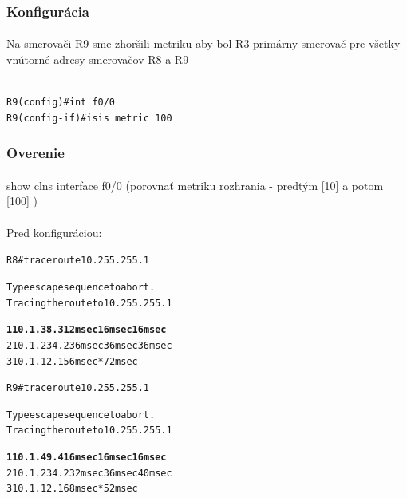 \documentclass[12pt,twoside,a4paper]{report}
\begin{document}
\subsubsection{Konfigurácia}
\paragraph{}
Na smerovači R9 sme zhoršili metriku aby bol R3 primárny smerovač pre všetky vnútorné adresy smerovačov R8 a R9

\noindent
{\selectfont
\begin{small}
\begin{verbatim}

R9(config)#int f0/0
R9(config-if)#isis metric 100
\end{verbatim}
\end{small}
}

\subsubsection{Overenie}
\paragraph{}
show clns interface f0/0 (porovnať metriku rozhrania - predtým [10] a potom [100] )


\paragraph{}
Pred konfiguráciou:

\noindent
{\selectfont
\begin{small}
\begin{alltt}
R8#traceroute 10.255.255.1

Type escape sequence to abort.
Tracing the route to 10.255.255.1

\textbf{  1 10.1.38.3 12 msec 16 msec 16 msec}
  2 10.1.234.2 36 msec 36 msec 36 msec
  3 10.1.12.1 56 msec *  72 msec



R9#traceroute 10.255.255.1

Type escape sequence to abort.
Tracing the route to 10.255.255.1

\textbf{  1 10.1.49.4 16 msec 16 msec 16 msec}
  2 10.1.234.2 32 msec 36 msec 40 msec
  3 10.1.12.1 68 msec *  52 msec

\end{alltt}
\end{small}
}
\end{document}
